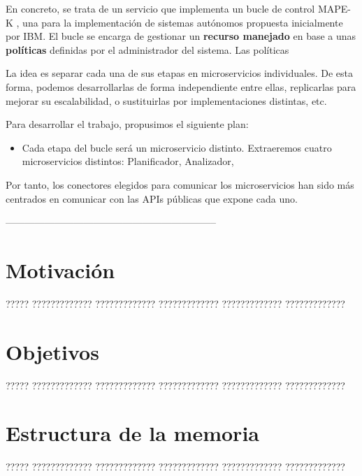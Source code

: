 En concreto, se trata de un servicio que implementa un bucle de control MAPE-K \cite{ibmcorporationArchitecturalBlueprintAutonomic2006, fonsServiciosAdaptivereadyPara2021}, una para la implementación de sistemas autónomos propuesta inicialmente por IBM. El bucle se encarga de gestionar un \textbf{recurso manejado} en base a unas \textbf{políticas} definidas por el administrador del sistema. Las políticas


La idea es separar cada una de sus etapas en microservicios individuales. De esta forma, podemos desarrollarlas de forma independiente entre ellas, replicarlas para mejorar su escalabilidad, o sustituirlas por implementaciones distintas, etc.

Para desarrollar el trabajo, propusimos el siguiente plan:
\begin{itemize}
  \item Cada etapa del bucle será un microservicio distinto. Extraeremos cuatro microservicios distintos: Planificador, Analizador,
\end{itemize}

Por tanto, los conectores elegidos para comunicar los microservicios han sido más centrados en comunicar con las APIs públicas que expone cada uno.

-----------------------------------------------------------------

\section{Motivación}

????? ????????????? ????????????? ????????????? ????????????? ?????????????

\section{Objetivos}

????? ????????????? ????????????? ????????????? ????????????? ?????????????

\section{Estructura de la memoria}

????? ????????????? ????????????? ????????????? ????????????? ?????????????


